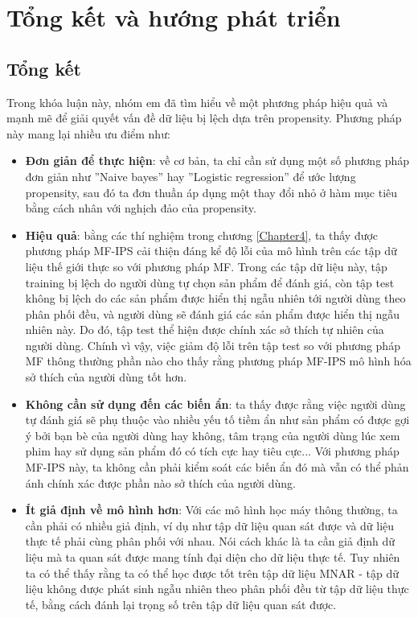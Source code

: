 \chapter{Tổng kết và hướng phát triển}
\label{Chapter5}

\section{Tổng kết}

Trong khóa luận này, nhóm em đã tìm hiểu về một phương pháp hiệu quả và mạnh mẽ để giải quyết vấn đề dữ liệu bị lệch dựa trên propensity. Phương pháp này mang lại nhiều ưu điểm như:
\begin{itemize}
    \item \textbf{Đơn giản để thực hiện}: về cơ bản, ta chỉ cần sử dụng một số phương pháp đơn giản như ''Naive bayes'' hay ''Logistic regression'' để ước lượng propensity, sau đó ta đơn thuần áp dụng một thay đổi nhỏ ở hàm mục tiêu bằng cách nhân với nghịch đảo của propensity.
    \item \textbf{Hiệu quả}: bằng các thí nghiệm trong chương \ref{Chapter4}, ta thấy được phương pháp MF-IPS cải thiện đáng kể độ lỗi của mô hình trên các tập dữ liệu thế giới thực so với phương pháp MF. Trong các tập dữ liệu này, tập training bị lệch do người dùng tự chọn sản phẩm để đánh giá, còn tập test không bị lệch do các sản phẩm được hiển thị ngẫu nhiên tới người dùng theo phân phối đều, và người dùng sẽ đánh giá các sản phẩm được hiển thị ngẫu nhiên này. Do đó, tập test thể hiện được chính xác sở thích tự nhiên của người dùng. Chính vì vậy, việc giảm độ lỗi trên tập test so với phương pháp MF thông thường phần nào cho thấy rằng phương pháp MF-IPS mô hình hóa sở thích của người dùng tốt hơn.
    \item \textbf{Không cần sử dụng đến các biến ẩn}: ta thấy được rằng việc người dùng tự đánh giá sẽ phụ thuộc vào nhiều yếu tố tiềm ẩn như sản phẩm có được gợi ý bởi bạn bè của người dùng hay không, tâm trạng của người dùng lúc xem phim hay sử dụng sản phẩm đó có tích cực hay tiêu  cực... Với phương pháp MF-IPS này, ta không cần phải kiểm soát các biến ẩn đó mà vẫn có thể phản ánh chính xác được phần nào sở thích của người dùng.
    \item \textbf{Ít giả định về mô hình hơn}: Với các mô hình học máy thông thường, ta cần phải có nhiều giả định, ví dụ như tập dữ liệu quan sát được và dữ liệu thực tế phải cùng phân phối với nhau. Nói cách khác là ta cần giả định dữ liệu mà ta quan sát được mang tính đại diện cho dữ liệu thực tế. Tuy nhiên ta có thể thấy rằng ta có thể học được tốt trên tập dữ liệu MNAR - tập dữ liệu không được phát sinh ngẫu nhiên theo phân phối đều từ tập dữ liệu thực tế, bằng cách đánh lại trọng số trên tập dữ liệu quan sát được. 
\end{itemize}

